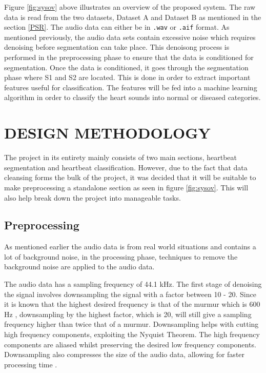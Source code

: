 \documentclass[10pt,twocolumn]{witseiepaper}
\begin{document}
Figure \ref{fig:sysov} above illustrates an overview of the proposed system. The raw data is read from the two datasets, Dataset A and Dataset B as mentioned in the section \ref{PSR}. The audio data can either be in \texttt{.wav} or \texttt{.aif} format.
As mentioned previously, the audio data sets contain excessive noise which requires denoising before segmentation can take place. This denoisong process is performed in the preprocessing phase to ensure that the data is conditioned for segmentation. Once the data is conditioned, it goes through the segmentation phase where S1 and S2 are located. This is done in order to extract important features useful for classification. The features will be fed into a machine learning algorithm in order to classify the heart sounds into normal or diseased categories.

%
\section{DESIGN METHODOLOGY}

The project in its entirety mainly consists of two main sections, heartbeat segmentation and heartbeat classification. However, due to the fact that data cleansing forms the bulk of the project, it was decided that it will be suitable to make preprocessing a standalone section as seen in figure \ref{fig:sysov}. This will also help break down the project into manageable tasks.

\subsection{Preprocessing}
As mentioned earlier the audio data is from real world situations and contains a lot of background noise, in the processing phase, techniques to remove the background noise are applied to the audio data.

The audio data has a sampling frequency of 44.1 kHz. The first stage of denoising the signal involves downsampling the signal with a factor between 10 - 20. Since it is known that the highest desired frequency is that of the murmur which is 600 Hz \cite{mumur}, downsampling by the highest factor, which is 20, will still give a sampling frequency higher than twice that of a murmur. Downsampling helps with cutting high frequency components, exploiting the Nyquist Theorem. The high frequency components are aliased whilst preserving the desired low frequency components. Downsampling also compresses the size of the audio data, allowing for faster processing time \cite{lavry2004sampling}.
\end{document}
